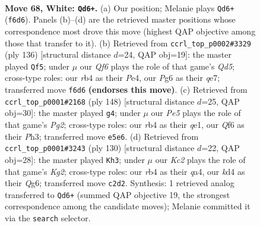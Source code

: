 \documentclass[11pt]{article}
\begin{document}
\clearpage

\begin{figure}[p]\centering
\begin{subfigure}{0.46\textwidth}\centering
\resizebox{\linewidth}{!}{%
\newchessgame
\chessboard[
  setfen={8/8/5QP1/4P2P/1r1k4/8/2K5/8 w - - 3 68},
  showmover=false,
  pgfstyle=straightmove, color=movearrow, markmove={f6-d6}
]}
\caption{}
\end{subfigure}\hfill
\begin{subfigure}{0.46\textwidth}\centering
\resizebox{\linewidth}{!}{%
\newchessgame
\chessboard[
  setfen={8/4q3/7k/3Q3P/4P3/p5P1/6K1/8 w - - 5 69},
  showmover=false,
  pgfstyle=straightmove, color=movearrow, markmove={d5-f5}
]}
\caption{}
\end{subfigure}
\\[4pt]
\begin{subfigure}{0.46\textwidth}\centering
\resizebox{\linewidth}{!}{%
\newchessgame
\chessboard[
  setfen={8/8/6Q1/7p/3K4/7P/5kP1/4q3 w - - 3 75},
  showmover=false,
  pgfstyle=straightmove, color=movearrow, markmove={g2-g4}
]}
\caption{}
\end{subfigure}\hfill
\begin{subfigure}{0.46\textwidth}\centering
\resizebox{\linewidth}{!}{%
\newchessgame
\chessboard[
  setfen={8/8/5pQ1/5P2/q4k2/8/5PK1/8 w - - 3 66},
  showmover=false,
  pgfstyle=straightmove, color=movearrow, markmove={g2-h3}
]}
\caption{}
\end{subfigure}
\caption{\textbf{Move 68, White: \texttt{Qd6+}.} (a) Our position; Melanie plays \texttt{Qd6+} (\texttt{f6d6}). Panels (b)--(d) are the retrieved master positions whose correspondence most drove this move (highest QAP objective among those that transfer to it). (b) Retrieved from \texttt{ccrl\_top\_p0002\#3329} (ply 136) [structural distance $d$=24, QAP obj=19]: the master played \texttt{Qf5}; under $\mu$ our \emph{Qf6} plays the role of that game's \emph{Qd5}; cross-type roles: our \emph{r}b4 as their \emph{P}e4, our \emph{P}g6 as their \emph{q}e7; transferred move \texttt{f6d6} \textbf{(endorses this move)}. (c) Retrieved from \texttt{ccrl\_top\_p0001\#2168} (ply 148) [structural distance $d$=25, QAP obj=30]: the master played \texttt{g4}; under $\mu$ our \emph{Pe5} plays the role of that game's \emph{Pg2}; cross-type roles: our \emph{r}b4 as their \emph{q}e1, our \emph{Q}f6 as their \emph{P}h3; transferred move \texttt{e5e6}. (d) Retrieved from \texttt{ccrl\_top\_p0001\#3243} (ply 130) [structural distance $d$=22, QAP obj=28]: the master played \texttt{Kh3}; under $\mu$ our \emph{Kc2} plays the role of that game's \emph{Kg2}; cross-type roles: our \emph{r}b4 as their \emph{q}a4, our \emph{k}d4 as their \emph{Q}g6; transferred move \texttt{c2d2}. Synthesis: 1 retrieved analog transferred to \texttt{Qd6+} (summed QAP objective 19, the strongest correspondence among the candidate moves); Melanie committed it via the \texttt{search} selector.}
\label{fig:thought-m134}
\end{figure}
\end{document}

